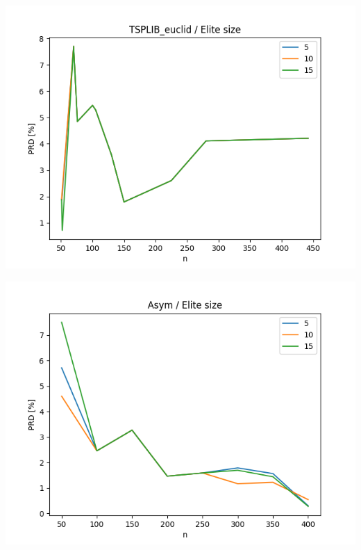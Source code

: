 \documentclass{article}
\begin{document}
\begin{center}
\includegraphics[width=\textwidth, 
                   height = 0.4\textheight, 
                   keepaspectratio]
                  {plots/tsplib_euclid_4_elite_num} 
\end{center}

\begin{center}
\includegraphics[width=\textwidth, 
                   height = 0.4\textheight, 
                   keepaspectratio]
                  {plots/asym_4_elite_num} 
\end{center}
\end{document}
